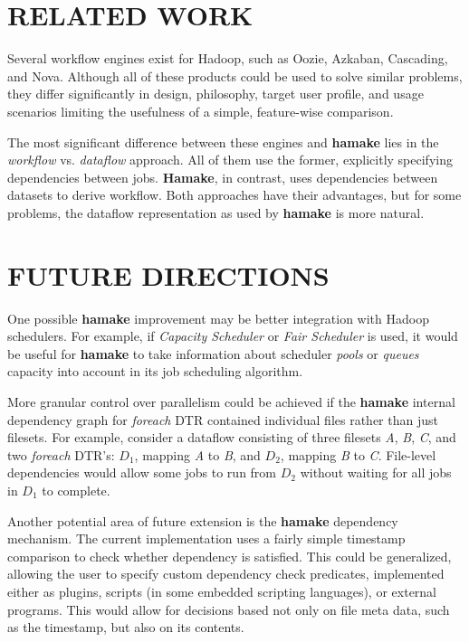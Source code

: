 \documentclass[a4paper,twoside]{article}
\begin{document}
\section{\uppercase{Related Work}}

Several workflow engines exist for Hadoop, such as Oozie\cite{ooize},
Azkaban\cite{azkaban}, Cascading\cite{cascading}, and
Nova\cite{olston2011nova}.  Although all of these products could be
used to solve similar problems, they differ significantly in design,
philosophy, target user profile, and usage scenarios limiting the
usefulness of a simple, feature-wise comparison.

The most significant difference between these engines and \textbf{hamake}
lies in the \textit{workflow} vs. \textit{dataflow} approach. All of them
use the former, explicitly specifying dependencies between
jobs. \textbf{Hamake}, in contrast, uses dependencies between datasets to derive workflow. Both approaches have their advantages, but for some problems, the dataflow representation as used by
\textbf{hamake} is more natural.

\section{\uppercase{Future Directions}}

One possible \textbf{hamake} improvement may be better integration with Hadoop schedulers. For example, if \textit{Capacity Scheduler} or \textit{Fair Scheduler} is used, it would be useful for \textbf{hamake} to take information about scheduler \textit{pools} or \textit{queues} capacity into account in its job scheduling algorithm.

More granular control over parallelism could be achieved if the
\textbf{hamake} internal dependency graph for \emph{foreach} DTR
contained individual files rather than just filesets. For example, consider a
dataflow consisting of three filesets \textit{A}, \textit{B},
\textit{C}, and two \emph{foreach} DTR's: \textit{$D_1$}, mapping
\textit{A} to \textit{B}, and \textit{$D_2$}, mapping \textit{B} to
\textit{C}. File-level dependencies would allow some jobs to run from
\textit{$D_2$} without waiting for all jobs in \textit{$D_1$} to
complete.

Another potential area of future extension is the \textbf{hamake} dependency
mechanism. The current implementation uses a fairly simple timestamp
comparison to check whether dependency is satisfied. This could be
generalized, allowing the user to specify custom dependency check
predicates, implemented either as plugins, scripts 
(in some embedded
scripting languages), or external programs. This would allow for
decisions based not only on file meta data, such as the timestamp, but also on its contents.
\end{document}
